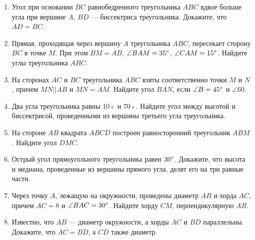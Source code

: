 \documentclass[12pt, a4paper]{article}
\begin{document}
		

\begin{enumerate}
	\item Угол при основании $BC$ равнобедренного треугольника $ABC$ вдвое больше угла при вершине $A$, $BD$ — биссектриса треугольника. Докажите, что $AD = BC$.
	\item Прямая, проходящая через вершину $A$ треугольника $ABC$, пересекает сторону $BC$ в точке $M$. При этом $BM = AB$, $\angle BAM = 35\degree$, $\angle CAM = 15\degree$. Найдите углы треугольника $ABC$.
	\item На сторонах $AC$ и $BC$ треугольника $ABC$ взяты соответственно точки $M$ и $N$, причем $MN||AB$ и $MN = AM$.
	Найдите угол $BAN$, если $\angle B = 45\degree$ и $\angle60$.
	\item Два угла треугольника равны 10◦ и 70◦. Найдите угол между высотой и биссектрисой, проведенными из вершины третьего угла треугольника.
	\item На стороне $AB$ квадрата $ABCD$ построен равносторонний треугольник $ABM$. Найдите угол $DMC$.
	\item Острый угол прямоугольного треугольника равен $30\degree$. Докажите, что высота и медиана, проведенные из вершины прямого угла, делят его на три равные части.
	\item Через точку $A$, лежащую на окружности, проведены диаметр $AB$ и хорда $AC$, причем $AC = 8$ и $\angle BAC = 30\degree$. Найдите хорду $CM$, перпендикулярную $AB$.
	\item Известно, что $AB$ — диаметр окружности, а хорды $AC$ и $BD$ параллельны. Докажите, что $AC = BD$, а $CD$ также диаметр.
\end{enumerate}
\end{document}
